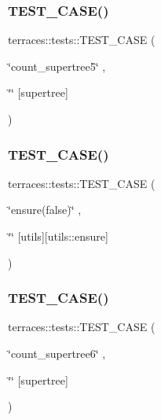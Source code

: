 \subsubsection{\texorpdfstring{T\+E\+S\+T\+\_\+\+C\+A\+S\+E()}{TEST\_CASE()}\hspace{0.1cm}{\footnotesize\ttfamily [34/78]}}
{\footnotesize\ttfamily terraces\+::tests\+::\+T\+E\+S\+T\+\_\+\+C\+A\+SE (\begin{DoxyParamCaption}\item[{\char`\"{}count\+\_\+supertree5\char`\"{}}]{,  }\item[{\char`\"{}\char`\"{}}]{\mbox{[}supertree\mbox{]} }\end{DoxyParamCaption})}

\mbox{\label{namespaceterraces_1_1tests_a16871530c0b1bef9b930d6f6d60f6bcf}} 
\subsubsection{\texorpdfstring{T\+E\+S\+T\+\_\+\+C\+A\+S\+E()}{TEST\_CASE()}\hspace{0.1cm}{\footnotesize\ttfamily [35/78]}}
{\footnotesize\ttfamily terraces\+::tests\+::\+T\+E\+S\+T\+\_\+\+C\+A\+SE (\begin{DoxyParamCaption}\item[{\char`\"{}ensure(false)\char`\"{}}]{,  }\item[{\char`\"{}\char`\"{}}]{\mbox{[}utils\mbox{]}\mbox{[}utils\+::ensure\mbox{]} }\end{DoxyParamCaption})}

\mbox{\label{namespaceterraces_1_1tests_a500bea3323b46d3aee9dfc5f705a1c7b}} 
\subsubsection{\texorpdfstring{T\+E\+S\+T\+\_\+\+C\+A\+S\+E()}{TEST\_CASE()}\hspace{0.1cm}{\footnotesize\ttfamily [36/78]}}
{\footnotesize\ttfamily terraces\+::tests\+::\+T\+E\+S\+T\+\_\+\+C\+A\+SE (\begin{DoxyParamCaption}\item[{\char`\"{}count\+\_\+supertree6\char`\"{}}]{,  }\item[{\char`\"{}\char`\"{}}]{\mbox{[}supertree\mbox{]} }\end{DoxyParamCaption})}

